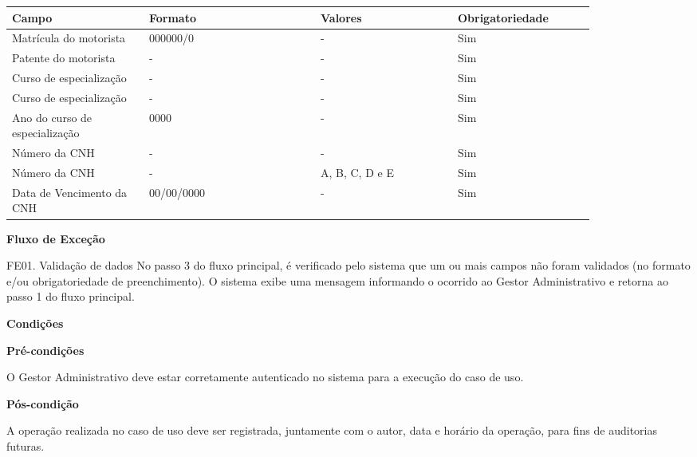    \begin{table*}[!h]
    \centering
      \begin{tabular}{|p{0.20\linewidth}|p{0.25\linewidth}|p{0.20\linewidth}|p{0.20\linewidth}|}
      \hline
      Campo  & Formato & Valores & Obrigatoriedade\\
      \hline

      Matrícula do motorista & 000000/0 & - & Sim\\ \hline

      Patente do motorista & - & - & Sim\\\hline
      
      Curso de especialização & - & - & Sim\\\hline
      
      Curso de especialização & - & - & Sim\\\hline
      
      Ano do curso de especialização & 0000 & - & Sim\\\hline
      
      Número da CNH & - & - & Sim\\\hline
      
      Número da CNH & - & A, B, C, D e E & Sim\\\hline
      
      Data de Vencimento da CNH & 00/00/0000 & - & Sim\\\hline
      
      \hline
      \end{tabular}
    \end{table*}

    \pagebreak
    
   {\raggedright
      \textbf{Fluxo de Exceção}
   }
   
   FE01. Validação de dados
	No passo 3 do fluxo principal, é verificado pelo sistema que um ou mais campos não foram validados (no formato e/ou
	obrigatoriedade de preenchimento). O sistema exibe uma mensagem informando o ocorrido ao Gestor Administrativo e retorna
	ao passo 1 do fluxo principal.

	
   {\raggedright
      \textbf{Condições}
   }
   
    
   \textbf{Pré-condições}
   
   O Gestor Administrativo deve estar corretamente autenticado no sistema para a execução do caso de uso.
   
   \textbf{Pós-condição}
   
   A operação realizada no caso de uso deve ser registrada, juntamente com o autor, data e horário da operação, para fins de auditorias futuras.

   \vfill
   \pagebreak

  